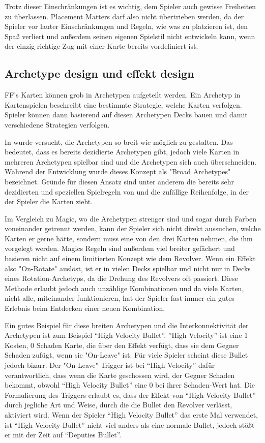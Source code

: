 Trotz dieser Einschränkungen ist es wichtig, dem Spieler auch gewisse Freiheiten zu überlassen. Placement Matters darf
also nicht übertrieben werden, da der Spieler vor lauter Einschränkungen und Regeln, wie was zu platzieren ist, den Spaß
verliert und außerdem seinen eigenen Spielstil nicht entwickeln kann, wenn der einzig richtige Zug mit einer Karte bereits vordefiniert ist.



\subsection{Archetype design und effekt design}\label{subsec:placementMatters}

FF's Karten können grob in Archetypen aufgeteilt werden. Ein Archetyp in Kartenspielen beschreibt eine bestimmte Strategie, welche Karten verfolgen.
Spieler können dann basierend auf diesen Archetypen Decks bauen und damit verschiedene Strategien verfolgen.


In \FF wurde versucht, die Archetypen so breit wie möglich zu gestalten. Das bedeutet, dass es bereits dezidierte Archetypen gibt,
jedoch viele Karten in mehreren Archetypen spielbar sind und die Archetypen sich auch überschneiden.
Während der Entwicklung wurde dieses Konzept als "Broad Archetypes" bezeichnet. Gründe für diesen Ansatz sind unter anderem
die bereits sehr dezidierten und speziellen Spielregeln von \FF und die zufällige Reihenfolge, in der der Spieler die Karten zieht.


Im Vergleich zu Magic, wo die Archetypen strenger sind und sogar durch Farben voneinander getrennt werden,
kann der Spieler sich nicht direkt aussuchen, welche Karten er gerne hätte, sondern muss eine von den drei Karten nehmen,
die ihm vorgelegt werden. Magics Regeln sind außerdem viel breiter gefächert und basieren nicht auf einem limitierten
Konzept wie dem Revolver. Wenn ein Effekt also "On-Rotate" auslöst, ist er in vielen Decks spielbar und nicht nur in Decks
eines Rotation-Archetyps, da die Drehung des Revolvers oft passiert. Diese Methode erlaubt jedoch auch unzählige
Kombinationen und da viele Karten, nicht alle, miteinander funktionieren, hat der Spieler fast immer ein gutes Erlebnis
beim Entdecken einer neuen Kombination.


Ein gutes Beispiel für diese breiten Archetypen und die Interkonnektivität der Archetypen ist zum Beispiel “High Velocity Bullet”.
”High Velocity” ist eine 1 Kosten, 0 Schaden Karte, die über den Effekt verfügt, dass sie dem Gegner Schaden zufügt, wenn sie "On-Leave" ist.
Für viele Spieler scheint diese Bullet jedoch bizarr. Der "On-Leave" Trigger ist bei “High Velocity” dafür verantwortlich,
dass wenn die Karte geschossen wird, der Gegner Schaden bekommt, obwohl “High Velocity Bullet” eine 0 bei ihrer Schaden-Wert hat.
Die Formulierung des Triggers erlaubt es, dass der Effekt von “High Velocity Bullet” durch jegliche Art und Weise, durch
die die Bullet den Revolver verlässt, aktiviert wird. Wenn der Spieler “High Velocity Bullet” das erste Mal verwendet,
ist “High Velocity Bullet” nicht viel anders als eine normale Bullet, jedoch stößt er mit der Zeit auf “Deputies Bullet”.


